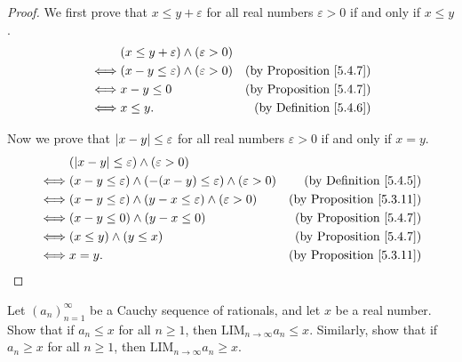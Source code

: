 \begin{proof}
    We first prove that \(x \leq y + \varepsilon\) for all real numbers \(\varepsilon > 0\) if and only if \(x \leq y\).
    \begin{align*}
             & (x \leq y + \varepsilon) \land (\varepsilon > 0)                                       \\
        \iff & (x - y \leq \varepsilon) \land (\varepsilon > 0) & \text{(by Proposition \ref{5.4.7})} \\
        \iff & x - y \leq 0                                     & \text{(by Proposition \ref{5.4.7})} \\
        \iff & x \leq y.                                        & \text{(by Definition \ref{5.4.6})}
    \end{align*}

    Now we prove that \(\abs*{x - y} \leq \varepsilon\) for all real numbers \(\varepsilon > 0\) if and only if \(x = y\).
    \begin{align*}
             & (\abs*{x - y} \leq \varepsilon) \land (\varepsilon > 0)                                                                   \\
        \iff & (x - y \leq \varepsilon) \land (-(x - y) \leq \varepsilon) \land (\varepsilon > 0) & \text{(by Definition \ref{5.4.5})}   \\
        \iff & (x - y \leq \varepsilon) \land (y - x \leq \varepsilon) \land (\varepsilon > 0)    & \text{(by Proposition \ref{5.3.11})} \\
        \iff & (x - y \leq 0) \land (y - x \leq 0)                                                & \text{(by Proposition \ref{5.4.7})}  \\
        \iff & (x \leq y) \land (y \leq x)                                                        & \text{(by Proposition \ref{5.4.7})}  \\
        \iff & x = y.                                                                             & \text{(by Proposition \ref{5.3.11})}
    \end{align*}
\end{proof}

\begin{exercise}\label{ex 5.4.8}
    Let \((a_n)_{n = 1}^{\infty}\) be a Cauchy sequence of rationals, and let \(x\) be a real number.
    Show that if \(a_n \leq x\) for all \(n \geq 1\), then \(\text{LIM}_{n \to \infty} a_n \leq x\).
    Similarly, show that if \(a_n \geq x\) for all \(n \geq 1\), then \(\text{LIM}_{n \to \infty} a_n \geq x\).
\end{exercise}


